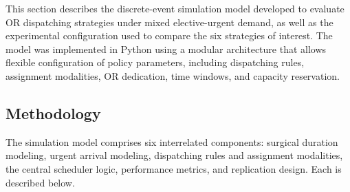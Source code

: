 \documentclass[sn-mathphys-num]{sn-jnl}
\begin{document}
This section describes the discrete-event simulation model developed to
evaluate OR dispatching strategies under mixed elective-urgent demand, as
well as the experimental configuration used to compare the six strategies
of interest. The model was implemented in Python using a modular
architecture that allows flexible configuration of policy parameters,
including dispatching rules, assignment modalities, OR dedication, time
windows, and capacity reservation.

\subsection{Methodology}
The simulation model comprises six interrelated components: surgical
duration modeling, urgent arrival modeling, dispatching rules and
assignment modalities, the central scheduler logic, performance metrics,
and replication design. Each is described below.
\end{document}
